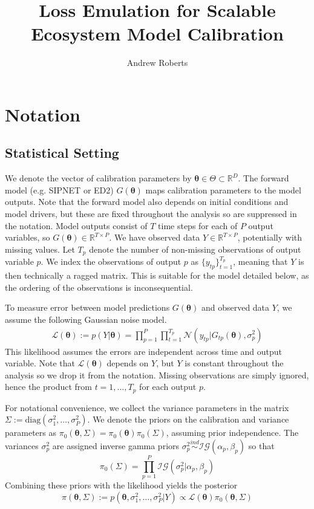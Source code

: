 \documentclass[12pt]{article}
\title{Loss Emulation for Scalable Ecosystem Model Calibration}
\author{Andrew Roberts}
\newcommand{\R}{\mathbb{R}}
\newcommand{\btheta}{\boldsymbol{\theta}}
\begin{document}
\maketitle
\tableofcontents
\newpage

\section{Notation}

\subsection{Statistical Setting}
We denote the vector of calibration parameters by $\btheta \in \Theta \subset \R^D$. The forward model (e.g. SIPNET or ED2) $G(\btheta)$ maps calibration parameters to the model outputs. Note that the forward 
model also depends on initial conditions and model drivers, but these are fixed throughout the analysis so are suppressed in the notation. Model outputs consist 
of $T$ time steps for each of $P$ output variables, so $G(\btheta) \in \mathbb{R}^{T \times P}$. We have observed data $Y \in \mathbb{R}^{T \times P}$, potentially with missing values. Let $T_p$ denote the number 
of non-missing observations of output variable $p$. We index the observations of output $p$ as $\{y_{tp}\}_{t = 1}^{T_p}$, meaning that $Y$ is then technically a ragged matrix. 
This is suitable for the model detailed below, as the ordering of the observations is inconsequential. 

To measure error between model 
predictions $G(\btheta)$ and observed data $Y$, we assume the following Gaussian noise model. 
\begin{align*}
\mathcal{L}(\btheta) := p(Y|\mathbf{\btheta}) = \prod_{p = 1}^{P} \prod_{t = 1}^{T_p} \mathcal{N}\left(y_{tp}| G_{tp}(\btheta), \sigma_p^2 \right)
\end{align*}
This likelihood assumes the errors are independent across time and output variable. Note that $\mathcal{L}(\btheta)$ depends on $Y$, but $Y$ is constant throughout the analysis so we drop it from the notation. Missing 
observations are simply ignored, hence the product from $t = 1, \dots, T_p$ for each output $p$.

For notational convenience, we collect the variance parameters in the matrix $\Sigma := \text{diag}\left(\sigma_1^2, \dots, \sigma_P^2 \right)$. 
We denote the priors on the calibration and variance parameters as  $\pi_0(\btheta, \Sigma) = \pi_0(\btheta)\pi_0(\Sigma)$, assuming prior independence.  
The variances $\sigma_p^2$ are assigned inverse gamma priors $\sigma_p^2 \overset{ind}{\sim} \mathcal{IG}(\alpha_p, \beta_p)$ so that 
\[\pi_0(\Sigma) = \prod_{p = 1}^{P} \mathcal{IG}(\sigma_p^2|\alpha_p, \beta_p)\]
Combining these priors with the likelihood yields the posterior 
\[\pi(\btheta, \Sigma) := p(\btheta, \sigma_1^2, \dots, \sigma_P^2|Y) \propto \mathcal{L}(\btheta)\pi_0(\btheta, \Sigma)\]
\end{document}
